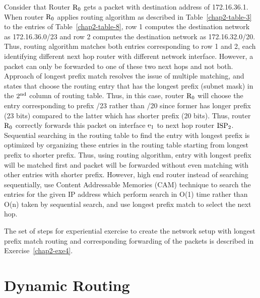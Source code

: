 \begin{multicols}{2}
Consider that Router ${\rm R}_{0}$ gets a packet with destination address of 172.16.36.1. When router ${\rm R}_{0}$ applies routing algorithm as described in Table~\ref{chap2-table-3} to the entries of Table~\ref{chap2-table-8}, row 1 computes the destination network as 172.16.36.0/23 and row 2 computes the destination network as 172.16.32.0/20. Thus, routing algorithm matches both entries corresponding to row 1 and 2, each identifying different next hop router with different network interface. However, a packet can only be forwarded to one of these two next hops and not both. Approach of longest prefix match resolves the issue of multiple matching, and states that choose the routing entry that has the longest prefix (subnet mask) in the $2^{\rm nd}$ column of routing table. Thus, in this case, router ${\rm R}_{0}$ will choose the entry corresponding to prefix /23 rather than /20 since former has longer prefix (23 bits) compared to the latter which has shorter prefix (20 bits). Thus, router ${\rm R}_{0}$ correctly forwards this packet on interface ${\rm e}_{1}$ to next hop router ${\rm ISP}_{2}$. Sequential searching in the routing table to find the entry with longest prefix is optimized by organizing these entries in the routing table starting from longest prefix to shorter prefix. Thus, using routing algorithm, entry with longest prefix will be matched first and packet will be forwarded without even matching with other entries with shorter prefix. However, high end router instead of searching sequentially, use Content Addressable Memories (CAM) technique to search the entries for the given IP address which perform search in O(1) time rather than O(n) taken by sequential search, and use longest prefix match to select the next hop.

\vspace{-.3cm}

The set of steps for experiential exercise to create the network setup with longest prefix match routing and corresponding forwarding of the packets is described in Exercise~\ref{chap2-exe4}.

\vspace{-.3cm}

\section{Dynamic Routing}\label{chap2-sec7}

\vspace{-.3cm}


\end{multicols}
